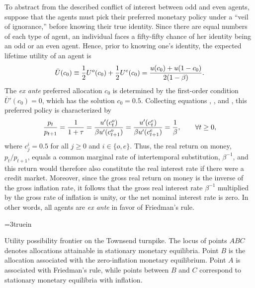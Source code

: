 To abstract from the described conflict of interest between odd and
even agents, suppose that the agents must pick their preferred
monetary policy under a ``veil of ignorance,'' before knowing their
true identity. Since there are equal numbers of each type of agent, an
individual faces a fifty-fifty chance of her identity being an odd or
an even agent. Hence, prior to knowing one's identity, the expected
lifetime utility of an agent is
$$
\bar U(c_0) \equiv {1 \over 2} U^o(c_0) + {1 \over 2} U^e(c_0)
            = {u(c_0) + u(1-c_0) \over 2(1-\beta)}.
$$
The {\it ex ante\/} preferred allocation $c_0$ is determined by the
first-order condition $\bar U'(c_0)=0$, which has the solution $c_0=0.5$.
Collecting equations , , and ,
this preferred policy is characterized by
$$  {p_t \over p_{t+1}} = {1 \over 1+\tau}
   ={u'(c^o_t) \over \beta u'(c^o_{t+1})}
   = {u'(c^e_t) \over \beta u'(c^e_{t+1})} = {1 \over \beta}, \qquad \forall t \geq 0,
$$
where $c^i_j=0.5$ for all $j \geq 0$ and $i\in\{o,e\}$. Thus, the
real return on money, $p_t/p_{t+1}$, equals a common marginal rate of
intertemporal substitution, $\beta^{-1}$, and this return would therefore
also constitute the real interest rate if there were a credit market.
Moreover, since the gross real return on money is the inverse of the gross
inflation rate, it follows that the gross real interest rate $\beta^{-1}$
multiplied by the gross rate of inflation is unity, or the net nominal
interest rate is zero. In other words, all agents are {\it ex ante\/} in favor
of Friedman's rule.   


\centerline{\epsfxsize=3truein}
\caption{Utility possibility frontier on the  Townsend turnpike.  The locus of
points $ABC$ denotes allocations attainable in stationary monetary
equilibria.  Point $B$ is the allocation associated with the
zero-inflation monetary equilibrium.  Point $A$ is associated with
Friedman's rule, while points between $B$ and $C$ correspond to
stationary monetary equilibria with inflation.}
\endfigure

